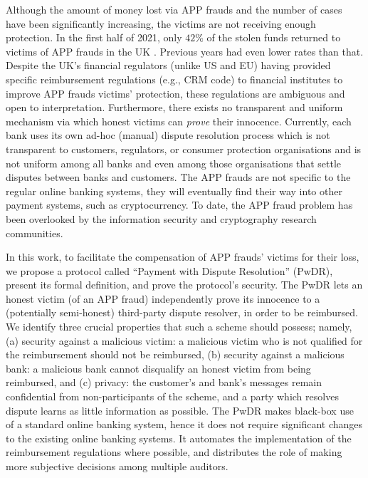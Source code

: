 Although the amount of money lost via  APP frauds and the number of cases have been significantly increasing, the victims are not receiving enough protection.  In the first half of 2021, only $42\%$ of the stolen funds returned to victims of  APP frauds in the UK \cite{2021-Half-Year-Fraud-Update}. Previous years had even lower rates than that.  Despite the UK's financial regulators (unlike US and EU) having provided specific reimbursement regulations (e.g., CRM code) to financial institutes to improve APP frauds victims' protection, these regulations are ambiguous and open to interpretation. 
%
Furthermore,  there exists no transparent and uniform mechanism via which honest victims can  \emph{prove} their innocence. Currently, each bank uses its own ad-hoc (manual) dispute resolution process which is not transparent to customers, regulators, or consumer protection organisations and is not uniform among all banks and even among those organisations that settle disputes between banks and customers. 
%
 The APP frauds are not specific to the regular online banking systems, they will eventually find their way into other payment systems, such as cryptocurrency.  To date, the APP fraud problem has been overlooked by the information security and cryptography research communities. 



 In this work, to facilitate the compensation of   APP frauds' victims for their loss, we propose a protocol called ``Payment with Dispute Resolution'' (PwDR), present its formal definition,  and prove the protocol's security.  The PwDR lets an honest victim (of an APP fraud)  independently prove its innocence to a  (potentially semi-honest) third-party dispute resolver, in order to be reimbursed.  We identify three crucial properties that such a scheme should possess; namely, (a) security against a malicious victim: a malicious victim who is not qualified for the reimbursement should not be reimbursed, (b) security against a malicious bank: a malicious bank cannot disqualify an honest victim from being reimbursed, and (c) privacy: the customer’s and bank’s messages remain confidential from non-participants of the scheme, and a party which resolves dispute learns as little information as possible.  The PwDR makes black-box use of a standard online banking system, hence it does not require significant changes to the existing online banking systems. %
%
   It automates the implementation of the reimbursement regulations where possible, and distributes the role of making more subjective decisions among multiple auditors.


